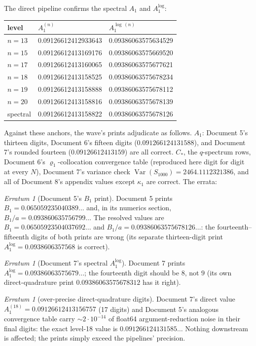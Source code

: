 \documentclass[11pt,oneside]{article}
\theoremstyle{definition}
\theoremstyle{remark}
\newtheorem{erratum}[theorem]{Erratum}
\newcommand{\Var}{\operatorname{Var}}
\begin{document}
The direct pipeline confirms the spectral $A_1$ and $A_1^{\log}$:
\begin{center}
\small
\begin{tabular}{@{}lll@{}}
\toprule
level & $A_1^{(n)}$ & $A_1^{\log\,(n)}$ \\
\midrule
$n=13$ & 0.09126612412933643 & 0.09386063575634529 \\
$n=15$ & 0.09126612413169176 & 0.09386063575669520 \\
$n=17$ & 0.09126612413160065 & 0.09386063575677621 \\
$n=18$ & 0.09126612413158525 & 0.09386063575678234 \\
$n=19$ & 0.09126612413158888 & 0.09386063575678112 \\
$n=20$ & 0.09126612413158816 & 0.09386063575678139 \\
spectral & 0.09126612413158822 & 0.09386063575678126 \\
\bottomrule
\end{tabular}
\end{center}

Against these anchors, the wave's prints adjudicate as follows.
$A_1$: Document 5's thirteen digits, Document 6's fifteen digits
($0.091266124131588$), and Document 7's rounded fourteen
($0.09126612413159$) are all correct.  $C_*$, the $q$-spectrum rows,
Document 6's $\varrho_1$-collocation convergence table (reproduced here
digit for digit at every $N$), Document 7's variance check
$\Var(S_{1000})=2464.1112321386$, and all of Document 8's appendix
values except $\kappa_1$ are correct.  The errata:

\begin{erratum}[Document 5's $B_1$ print]
\label{err:doc5-B1}
Document 5 prints $B_1=0.065059235040389\ldots$ and, in its numerics
section, $B_1/a=0.093860635756799\ldots$  The resolved values are
$B_1=0.06505923504037692\ldots$ and $B_1/a=0.09386063575678126\ldots$:
the fourteenth--fifteenth digits of both prints are wrong (its separate
thirteen-digit print $A_1^{\log}=0.0938606357568$ is correct).
\end{erratum}

\begin{erratum}[Document 7's spectral $A_1^{\log}$]
\label{err:doc7-alog}
Document 7 prints $A_1^{\log}=0.09386063575679\ldots$; the fourteenth
digit should be $8$, not $9$ (its own direct-quadrature print
$0.09386063575678312$ has it right).
\end{erratum}

\begin{erratum}[over-precise direct-quadrature digits]
\label{err:doc7-direct}
Document 7's direct value $A_1^{(18)}=0.09126612413156757$ (17 digits)
and Document 5's analogous convergence table carry $\sim\!2\cdot10^{-14}$
of float64 argument-reduction noise in their final digits: the exact
level-18 value is $0.091266124131585\ldots$  Nothing downstream is
affected; the prints simply exceed the pipelines' precision.
\end{erratum}
\end{document}
